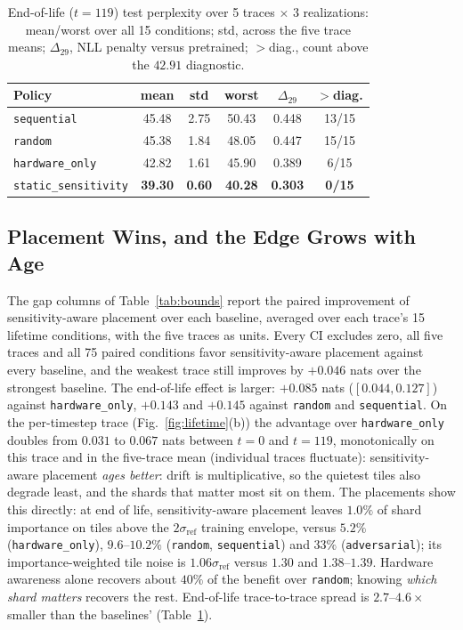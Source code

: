 \documentclass[journal]{IEEEtran}
\newcommand{\policy}[1]{\texttt{#1}}
\begin{document}
\begin{table}[t]
\centering
\caption{End-of-life ($t{=}119$) test perplexity over 5 traces $\times$
3 realizations: mean/worst over all 15 conditions; std, across the five
trace means; $\Delta_{29}$, NLL penalty versus pretrained; $>$diag.,
count above the $42.91$ diagnostic.}
\label{tab:eol}
\footnotesize
\setlength{\tabcolsep}{4pt}
\begin{tabular}{lccccc}
\toprule
Policy & mean & std & worst & $\Delta_{29}$ & $>$diag. \\
\midrule
\policy{sequential} & 45.48 & 2.75 & 50.43 & 0.448 & 13/15 \\
\policy{random} & 45.38 & 1.84 & 48.05 & 0.447 & 15/15 \\
\policy{hardware\_only} & 42.82 & 1.61 & 45.90 & 0.389 & 6/15 \\
\policy{static\_sensitivity} & \textbf{39.30} & \textbf{0.60} &
\textbf{40.28} & \textbf{0.303} & \textbf{0/15} \\
\bottomrule
\end{tabular}
\end{table}

\subsection{Placement Wins, and the Edge Grows with Age}
\label{sec:r2}
The gap columns of Table~\ref{tab:bounds} report the paired
improvement of sensitivity-aware placement over each baseline, averaged
over each trace's 15 lifetime conditions, with the five traces as
units. Every CI excludes zero, all five traces and all 75 paired
conditions favor sensitivity-aware placement against every baseline,
and the weakest trace still improves by $+0.046$ nats over the
strongest baseline. The end-of-life effect is larger: $+0.085$
nats ($[0.044, 0.127]$) against \policy{hardware\_only}, $+0.143$ and
$+0.145$ against \policy{random} and \policy{sequential}. On the
per-timestep trace (Fig.~\ref{fig:lifetime}(b)) the advantage over
\policy{hardware\_only} doubles from $0.031$ to $0.067$ nats between
$t{=}0$ and $t{=}119$, monotonically on this trace and in the
five-trace mean (individual traces fluctuate): sensitivity-aware
placement
\emph{ages better}: drift is multiplicative, so the quietest tiles
also degrade least, and the shards that matter most sit on them. The
placements show this directly: at end of
life, sensitivity-aware placement leaves $1.0\%$ of shard importance on
tiles above the $2\sigma_{\mathrm{ref}}$ training envelope, versus
$5.2\%$ (\policy{hardware\_only}), $9.6$--$10.2\%$ (\policy{random},
\policy{sequential}) and $33\%$ (\policy{adversarial}); its
importance-weighted tile noise is $1.06\sigma_{\mathrm{ref}}$ versus
$1.30$ and $1.38$--$1.39$. Hardware awareness alone recovers about
$40\%$ of the benefit over \policy{random}; knowing \emph{which shard
matters} recovers the rest. End-of-life trace-to-trace spread is
$2.7$--$4.6\times$ smaller than the baselines' (Table~\ref{tab:eol}).
\end{document}
